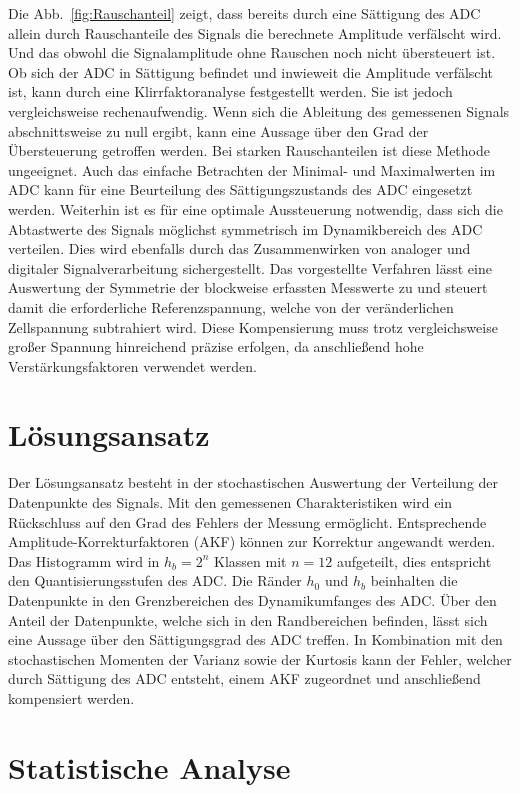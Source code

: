 Die Abb.~\ref{fig:Rauschanteil} zeigt, dass bereits durch eine Sättigung des ADC allein durch Rauschanteile des Signals die berechnete Amplitude verfälscht wird. Und das obwohl die Signalamplitude ohne Rauschen noch nicht übersteuert ist. Ob sich der ADC in Sättigung befindet und inwieweit die Amplitude verfälscht ist, kann durch eine Klirrfaktoranalyse festgestellt werden. Sie ist jedoch vergleichsweise rechenaufwendig. Wenn sich die Ableitung des gemessenen Signals abschnittsweise zu null ergibt, kann eine Aussage über den Grad der Übersteuerung getroffen werden. Bei starken Rauschanteilen ist diese Methode ungeeignet. Auch das einfache Betrachten der Minimal- und Maximalwerten im ADC kann für eine Beurteilung des Sättigungszustands des ADC eingesetzt werden.
Weiterhin ist es für eine optimale Aussteuerung notwendig, dass sich die Abtastwerte des Signals möglichst symmetrisch im Dynamikbereich des ADC verteilen. Dies wird ebenfalls durch das Zusammenwirken von analoger und digitaler Signalverarbeitung sichergestellt. Das vorgestellte Verfahren lässt eine Auswertung der Symmetrie der blockweise erfassten Messwerte zu und steuert damit die erforderliche Referenzspannung, welche von der veränderlichen Zellspannung subtrahiert wird. Diese Kompensierung muss trotz vergleichsweise großer Spannung hinreichend präzise erfolgen, da anschließend hohe Verstärkungsfaktoren verwendet werden.

\section{Lösungsansatz}

Der Lösungsansatz besteht in der stochastischen Auswertung der Verteilung der Datenpunkte des Signals. Mit den gemessenen Charakteristiken wird ein Rückschluss auf den Grad des Fehlers der Messung ermöglicht. Entsprechende Amplitude-Korrekturfaktoren (AKF) können zur Korrektur angewandt werden. Das Histogramm wird in $h_b = 2^n$ Klassen mit $n = 12$ aufgeteilt, dies entspricht den Quantisierungsstufen des ADC. Die Ränder $h_0$ und $h_b$ beinhalten die Datenpunkte in den Grenzbereichen des Dynamikumfanges des ADC. Über den Anteil der Datenpunkte, welche sich in den Randbereichen befinden, lässt sich eine Aussage über den Sättigungsgrad des ADC treffen. In Kombination mit den stochastischen Momenten der Varianz sowie der Kurtosis kann der Fehler, welcher durch Sättigung des ADC entsteht, einem AKF zugeordnet und anschließend kompensiert werden.  

\section{Statistische Analyse}

